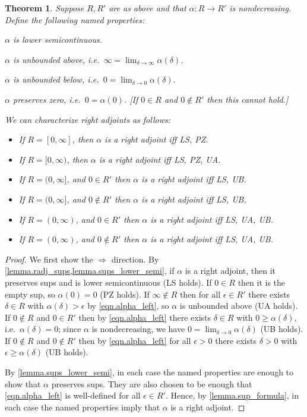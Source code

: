 \documentclass[11pt, one side, article]{memoir}
\theoremstyle{definition}
\theoremstyle{plain}
\newtheorem{theorem}[definitionx]{Theorem}
\begin{document}
\begin{theorem}
Suppose $R,R'$ are as above and that $\alpha\colon R\to R'$ is nondecreasing. Define the following named properties:
\begin{description}[leftmargin=\parindent,labelindent=\parindent]
	\item[LS:] $\alpha$ is lower semicontinuous.
	\item[UA:] $\alpha$ is unbounded above, i.e.\ $\infty=\lim_{\delta\to\infty}\alpha(\delta)$.
	\item[UB:] $\alpha$ is unbounded below, i.e.\ $0=\lim_{\delta\to0}\alpha(\delta)$.
	\item[PZ:] $\alpha$ preserves zero, i.e.\ $0=\alpha(0)$. [If $0\in R$ and $0\not\in R'$ then this cannot hold.]
\end{description}
We can characterize right adjoints as follows:
\begin{itemize}
	\item If $R=[0,\infty]$, then $\alpha$ is a right adjoint iff LS, PZ.
	\item If $R=[0,\infty)$, then $\alpha$ is a right adjoint iff LS, PZ, UA.
	\item If $R=(0,\infty]$, and $0\in R'$ then $\alpha$ is a right adjoint iff LS, UB.
	\item If $R=(0,\infty]$, and $0\not\in R'$ then $\alpha$ is a right adjoint iff LS, UB.
	\item If $R=(0,\infty)$, and $0\in R'$ then $\alpha$ is a right adjoint iff LS, UA, UB.
	\item If $R=(0,\infty)$, and $0\not\in R'$ then $\alpha$ is a right adjoint iff LS, UA, UB.
\end{itemize}
\end{theorem}
\begin{proof}
We first show the $\Rightarrow$ direction. By \cref{lemma.radj_sups,lemma.sups_lower_semi}, if $\alpha$ is a right adjoint, then it preserves sups and is lower semicontinuous (LS holds). If $0\in R$ then it is the empty sup, so $\alpha(0)=0$ (PZ holds). If $\infty\not\in R$ then for all $\epsilon\in R'$ there exists $\delta\in R$ with $\alpha(\delta)>\epsilon$ by \eqref{eqn.alpha_left}, so $\alpha$ is unbounded above (UA holds). If $0\not\in R$ and $0\in R'$ then by \eqref{eqn.alpha_left} there exists $\delta\in R$ with $0\geq\alpha(\delta)$, i.e.\ $\alpha(\delta)=0$; since $\alpha$ is nondecreasing, we have $0=\lim_{\delta\to 0}\alpha(\delta)$ (UB holds). If $0\not\in R$ and $0\not\in R'$ then by \eqref{eqn.alpha_left} for all $\epsilon>0$ there exists $\delta>0$ with $\epsilon\geq\alpha(\delta)$ (UB holds).

By \cref{lemma.sups_lower_semi}, in each case the named properties are enough to show that $\alpha$ preserves sups. They are also chosen to be enough that \eqref{eqn.alpha_left} is well-defined for all $\epsilon\in R'$. Hence, by \cref{lemma.sup_formula}, in each case the named properties imply that $\alpha$ is a right adjoint.
\end{proof}
\end{document}
